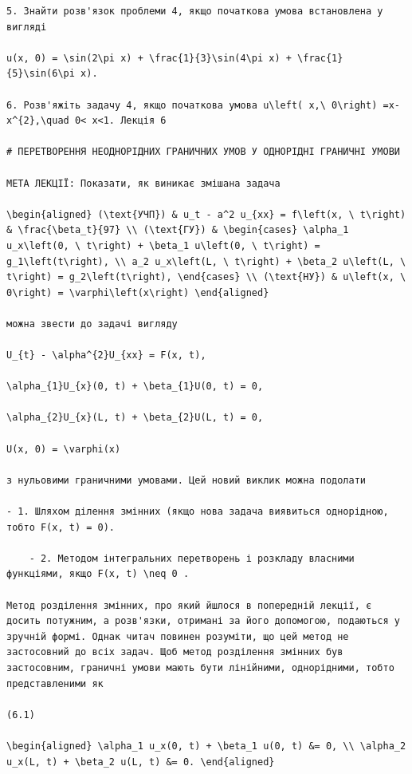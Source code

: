 \documentclass[
  ukrainian,
]{article}
\begin{document}
\begin{verbatim}
5. Знайти розв'язок проблеми 4, якщо початкова умова встановлена у вигляді

u(x, 0) = \sin(2\pi x) + \frac{1}{3}\sin(4\pi x) + \frac{1}{5}\sin(6\pi x).

6. Розв'яжіть задачу 4, якщо початкова умова u\left( x,\ 0\right) =x-x^{2},\quad 0< x<1. Лекція 6

# ПЕРЕТВОРЕННЯ НЕОДНОРІДНИХ ГРАНИЧНИХ УМОВ У ОДНОРІДНІ ГРАНИЧНІ УМОВИ

МЕТА ЛЕКЦІЇ: Показати, як виникає змішана задача

\begin{aligned} (\text{УЧП}) & u_t - a^2 u_{xx} = f\left(x, \ t\right) & \frac{\beta_t}{97} \\ (\text{ГУ}) & \begin{cases} \alpha_1 u_x\left(0, \ t\right) + \beta_1 u\left(0, \ t\right) = g_1\left(t\right), \\ a_2 u_x\left(L, \ t\right) + \beta_2 u\left(L, \ t\right) = g_2\left(t\right), \end{cases} \\ (\text{HУ}) & u\left(x, \ 0\right) = \varphi\left(x\right) \end{aligned}

можна звести до задачі вигляду

U_{t} - \alpha^{2}U_{xx} = F(x, t),

\alpha_{1}U_{x}(0, t) + \beta_{1}U(0, t) = 0,

\alpha_{2}U_{x}(L, t) + \beta_{2}U(L, t) = 0,

U(x, 0) = \varphi(x)

з нульовими граничними умовами. Цей новий виклик можна подолати

- 1. Шляхом ділення змінних (якщо нова задача виявиться однорідною, тобто F(x, t) = 0).

    - 2. Методом інтегральних перетворень і розкладу власними функціями, якщо F(x, t) \neq 0 .

Метод розділення змінних, про який йшлося в попередній лекції, є досить потужним, а розв'язки, отримані за його допомогою, подаються у зручній формі. Однак читач повинен розуміти, що цей метод не застосовний до всіх задач. Щоб метод розділення змінних був застосовним, граничні умови мають бути лінійними, однорідними, тобто представленими як

(6.1)

\begin{aligned} \alpha_1 u_x(0, t) + \beta_1 u(0, t) &= 0, \\ \alpha_2 u_x(L, t) + \beta_2 u(L, t) &= 0. \end{aligned}


\end{verbatim}
\end{document}
